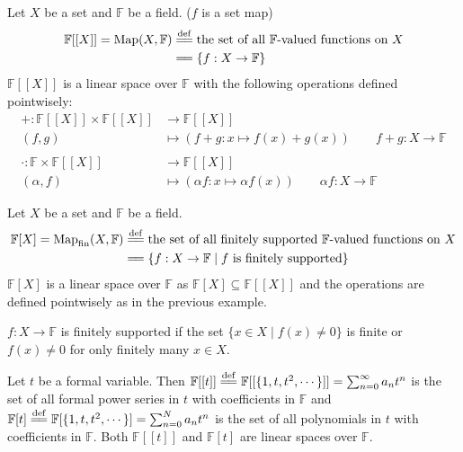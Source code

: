 \documentclass[
	11pt, %
	fleqn, %
	a4paper, %
]{LegrandOrangeBook}
\newcommand{\F}{\mathbb{F}} %
\newcommand{\Map}[2]{\text{Map}(#1, #2)} %
\begin{document}
\begin{example}
    Let $X$ be a set and $\F$ be a field. ($f$ is a set map)
    \[
    \begin{split}
        \F[[X]] = \Map{X}{\F} &\overset{\mathrm{def}}{=\joinrel=} \text{the set of all $\F$-valued functions on } X \\
        &=\joinrel= \left\{ f : X \to \F \right\}
    \end{split}
    \]
    $\F[[X]]$ is a linear space over $\F$ with the following operations defined pointwisely:
    \[
        \begin{split}
            + : \F[[X]] \times \F[[X]] &\to \F[[X]] \\
            (f,g) &\mapsto (f+g: x \mapsto f(x) + g(x)) \qquad f + g : X \to \F \\ \\
            \cdot : \F \times \F[[X]] &\to \F[[X]] \\
            (\alpha,f) &\mapsto (\alpha f: x \mapsto \alpha f(x)) \qquad \alpha f : X \to \F
        \end{split}
    \]
\end{example}

\begin{example}
    Let $X$ be a set and $\F$ be a field.
    \[
        \begin{split}
            \F[X] = \text{Map}_{\text{fin}}(X, \F) &\overset{\mathrm{def}}{=\joinrel=} \text{the set of all finitely supported $\F$-valued functions on } X \\
            &=\joinrel= \left\{ f : X \to \F \mid f \text{ is finitely supported} \right\}
        \end{split}
    \]
    $\F[X]$ is a linear space over $\F$ as $\F[X] \subseteq \F[[X]]$ and the operations are defined pointwisely as in the previous example.

    $f: X \to \F$ is finitely supported if the set $\{ x \in X \mid f(x) \neq 0 \}$ is finite or $f(x) \neq 0$ for only finitely many $x \in X$.
\end{example}

\begin{example}
    Let $t$ be a formal variable. Then $\F[[t]] \overset{\mathrm{def}}{=\joinrel=} \F[[\{ 1, t, t^2, \cdots \}]] = \sum_{n = 0}^{\infty} a_n t^n$ is the set of all formal power series in $t$ with coefficients in $\F$ and $\F[t] \overset{\mathrm{def}}{=\joinrel=} \F[\{ 1, t, t^2, \cdots \}] = \sum_{n = 0}^{N} a_n t^n$ is the set of all polynomials in $t$ with coefficients in $\F$. Both $\F[[t]]$ and $\F[t]$ are linear spaces over $\F$.
\end{example}
\end{document}

